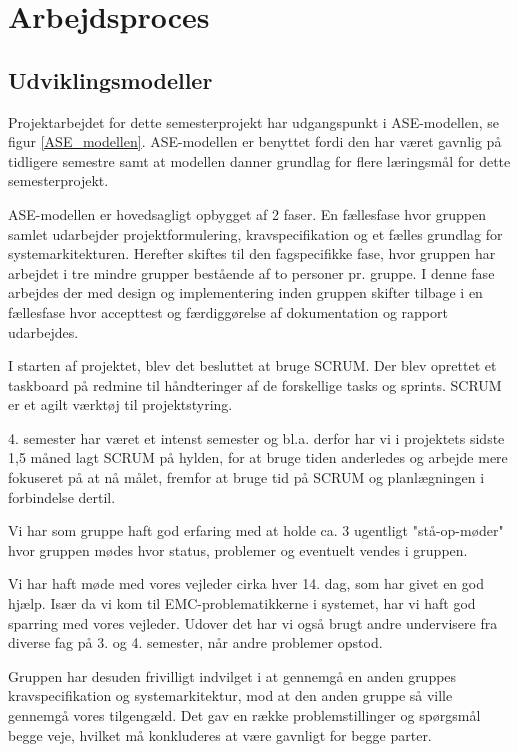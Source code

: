 
\chapter{Arbejdsproces}
\label{arbejdsproces}
\section{Udviklingsmodeller}

Projektarbejdet for dette semesterprojekt har udgangspunkt i ASE-modellen, se figur \ref{ASE_modellen}. ASE-modellen er benyttet fordi den har været gavnlig på tidligere semestre samt at modellen danner grundlag for flere læringsmål for dette semesterprojekt.

ASE-modellen er hovedsagligt opbygget af 2 faser. En fællesfase hvor gruppen samlet udarbejder projektformulering, kravspecifikation og et fælles grundlag for systemarkitekturen. Herefter skiftes til den fagspecifikke fase, hvor gruppen har arbejdet i tre mindre grupper bestående af to personer pr. gruppe. I denne fase arbejdes der med design og implementering inden gruppen skifter tilbage i en fællesfase hvor accepttest og færdiggørelse af dokumentation og rapport udarbejdes. 


I starten af projektet, blev det besluttet at bruge SCRUM. Der blev oprettet et taskboard på redmine til håndteringer af de forskellige tasks og sprints. SCRUM er et agilt værktøj til projektstyring. 

4. semester har været et intenst semester og bl.a. derfor har vi i projektets sidste 1,5 måned lagt SCRUM på hylden, for at bruge tiden anderledes og arbejde mere fokuseret på at nå målet, fremfor at bruge tid på SCRUM og planlægningen i forbindelse dertil. 

Vi har som gruppe haft god erfaring med at holde ca. 3 ugentligt "stå-op-møder" hvor gruppen mødes hvor status, problemer og eventuelt vendes i gruppen. 

Vi har haft møde med vores vejleder cirka hver 14. dag, som har givet en god hjælp. Især da vi kom til EMC-problematikkerne i systemet, har vi haft god sparring med vores vejleder. Udover det har vi også brugt andre undervisere fra diverse fag på 3. og 4. semester, når andre problemer opstod.

Gruppen har desuden frivilligt indvilget i at gennemgå en anden gruppes kravspecifikation og systemarkitektur, mod at den anden gruppe så ville gennemgå vores tilgengæld. Det gav en række problemstillinger og spørgsmål begge veje, hvilket må konkluderes at være gavnligt for begge parter.

